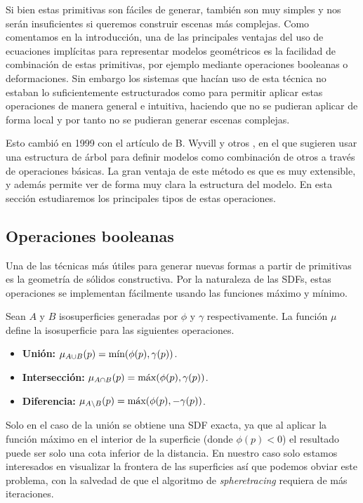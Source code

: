 
Si bien estas primitivas son fáciles de generar, también son muy simples y nos serán insuficientes si queremos construir escenas más complejas. Como comentamos en la introducción, una de las principales ventajas del uso de ecuaciones implícitas para representar modelos geométricos es la facilidad de combinación de estas primitivas, por ejemplo mediante operaciones booleanas o deformaciones. Sin embargo los sistemas que hacían uso de esta técnica no estaban lo suficientemente estructurados como para permitir aplicar estas operaciones de manera general e intuitiva, haciendo que no se pudieran aplicar de forma local y por tanto no se pudieran generar escenas complejas.\newline


Esto cambió en 1999 con el artículo de B. Wyvill y otros \cite{blobtree}, en el que sugieren usar una estructura de árbol para definir modelos como combinación de otros a través de operaciones básicas. La gran ventaja de este método es que es muy extensible, y además permite ver de forma muy clara la estructura del modelo. En esta sección estudiaremos los principales tipos de estas operaciones.

\subsection{Operaciones booleanas}
Una de las técnicas más útiles para generar nuevas formas a partir de primitivas es la geometría de sólidos constructiva. Por la naturaleza de las SDFs, estas operaciones se implementan fácilmente usando las funciones máximo y mínimo.

\begin{definicion}\label{p:boolean}
    Sean $A$ y $B$ isosuperficies generadas por $\phi$ y $\gamma$ respectivamente. La función $\mu$ define la isosuperficie para las siguientes operaciones.
    \begin{itemize}
        \item \textbf{Unión: } $\mu_{A\cup B}(p) = \Min(\phi(p), \gamma(p))$.
        \item \textbf{Intersección: } $\mu_{A\cap B}(p) = \Max(\phi(p), \gamma(p))$.
        \item \textbf{Diferencia: } $\mu_{A\setminus B}(p) = \Max(\phi(p), -\gamma(p))$.
    \end{itemize}
\end{definicion}

Solo en el caso de la unión se obtiene una SDF exacta, ya que al aplicar la función máximo en el interior de la superficie (donde $\phi(p) < 0$) el resultado puede ser solo una cota inferior de la distancia. En nuestro caso solo estamos interesados en visualizar la frontera de las superficies así que podemos obviar este problema, con la salvedad de que el algoritmo de \textit{spheretracing} requiera de más iteraciones.\newline

